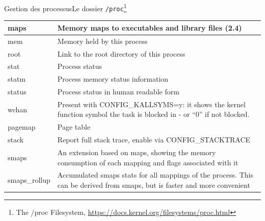 \documentclass{beamer}
\begin{document}
\begin{frame}{Gestion des processus}{Le dossier \lstinline{/proc}\footnote{The /proc Filesystem, \url{https://docs.kernel.org/filesystems/proc.html}}}
\begin{footnotesize}
\begin{tiny}
\begin{table}[h!]
\begin{tabular}{|p{1.5cm}|p{9cm}|}
                        \hline
                        maps          & Memory maps to executables and library files (2.4)                                                                          \\
                        \hline
                        mem           & Memory held by this process                                                                                                 \\
                        \hline
                        root          & Link to the root directory of this process                                                                                  \\
                        \hline
                        stat          & Process status                                                                                                              \\
                        \hline
                        statm         & Process memory status information                                                                                           \\
                        \hline
                        status        & Process status in human readable form                                                                                       \\
                        \hline
                        wchan         & Present with CONFIG\_KALLSYMS=y: it shows the kernel function symbol the task is blocked in - or “0” if not blocked.        \\
                        \hline
                        pagemap       & Page table                                                                                                                  \\
                        \hline
                        stack         & Report full stack trace, enable via CONFIG\_STACKTRACE                                                                      \\
                        \hline
                        smaps         & An extension based on maps, showing the memory consumption of each mapping and flags associated with it                     \\
                        \hline
                        smaps\_rollup & Accumulated smaps stats for all mappings of the process. This can be derived from smaps, but is faster and more convenient  \\

\end{tabular}
\end{table}
\end{tiny}
\end{footnotesize}
\end{frame}
\end{document}
